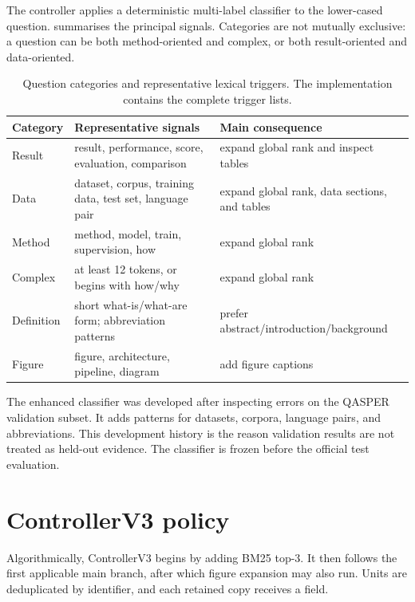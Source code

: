 The controller applies a deterministic multi-label classifier to the lower-cased question.  summarises the principal signals. Categories are not mutually exclusive: a question can be both method-oriented and complex, or both result-oriented and data-oriented.

\begin{table}[tb]
\centering
\caption{Question categories and representative lexical triggers. The implementation contains the complete trigger lists.}
\label{tab:qtypes}
\begin{tabularx}{\textwidth}{@{}lXl@{}}
\toprule
Category & Representative signals & Main consequence \\
\midrule
Result & result, performance, score, evaluation, comparison & expand global rank and inspect tables \\
Data & dataset, corpus, training data, test set, language pair & expand global rank, data sections, and tables \\
Method & method, model, train, supervision, how & expand global rank \\
Complex & at least 12 tokens, or begins with how/why & expand global rank \\
Definition & short what-is/what-are form; abbreviation patterns & prefer abstract/introduction/background \\
Figure & figure, architecture, pipeline, diagram & add figure captions \\
\bottomrule
\end{tabularx}
\end{table}

The enhanced classifier was developed after inspecting errors on the QASPER validation subset. It adds patterns for datasets, corpora, language pairs, and abbreviations. This development history is the reason validation results are not treated as held-out evidence. The classifier is frozen before the official test evaluation.

\section{ControllerV3 policy}

Algorithmically, ControllerV3 begins by adding BM25 top-3. It then follows the first applicable main branch, after which figure expansion may also run. Units are deduplicated by identifier, and each retained copy receives a  field.

